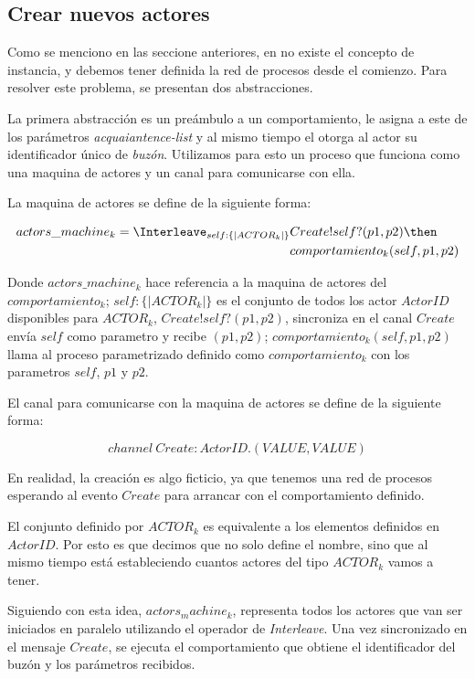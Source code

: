 \subsection{Crear nuevos actores}\label{modelo:crear}

Como se menciono en las seccione anteriores, en \CSP no existe el concepto de instancia, y debemos tener definida la red de procesos desde el comienzo. Para resolver este problema, se presentan dos abstracciones.

La primera abstracción es un preámbulo a un comportamiento, le asigna a este de los parámetros \textit{acquaiantence-list} y al mismo tiempo el otorga al actor su identificador único de \textit{buzón}. Utilizamos para esto un proceso que funciona como una maquina de actores y un canal para comunicarse con ella.

La maquina de actores se define de la siguiente forma:

\begin{align*}
actors\_machine_k = \Interleave_{ self : \{| ACTOR_k |\} } & Create!self?(p1, p2) \then \\
& comportamiento_k(self, p1, p2) 
\end{align*}

Donde $actors\_machine_k$ hace referencia a la maquina de actores del $comportamiento_k$; $self : \{| ACTOR_k |\}$ es el conjunto de todos los actor $ActorID$ disponibles para $ACTOR_k$, $Create!self?(p1, p2)$, sincroniza en el canal $Create$ envía $self$ como parametro y recibe $(p1, p2)$; $comportamiento_k(self, p1, p2)$ llama al proceso parametrizado definido como $comportamiento_k$ con los parametros $self$, $p1$ y $p2$.

El canal para comunicarse con la maquina de actores se define de la siguiente forma:

\[
channel\ Create:ActorID.(VALUE, VALUE)
\]

En realidad, la creación es algo ficticio, ya que tenemos una red de procesos \CSP esperando al evento $Create$ para arrancar con el comportamiento definido. 

El conjunto definido por $ACTOR_k$ es equivalente a los elementos definidos en $ActorID$. Por esto es que decimos que no solo define el nombre, sino que al mismo tiempo está estableciendo cuantos actores del tipo $ACTOR_k$ vamos a tener.

Siguiendo con esta idea, $actors_machine_k$, representa todos los actores que van ser iniciados en paralelo utilizando el operador de \textit{Interleave}. Una vez sincronizado en el mensaje $Create$, se ejecuta el comportamiento que obtiene el identificador del buzón y los parámetros recibidos.


